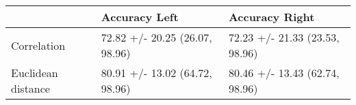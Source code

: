 \begin{tabular}{lll}
\toprule
{} &                   Accuracy Left &                  Accuracy Right \\
\midrule
Correlation        &  72.82 +/- 20.25 (26.07, 98.96) &  72.23 +/- 21.33 (23.53, 98.96) \\
Euclidean distance &  80.91 +/- 13.02 (64.72, 98.96) &  80.46 +/- 13.43 (62.74, 98.96) \\
\bottomrule
\end{tabular}
